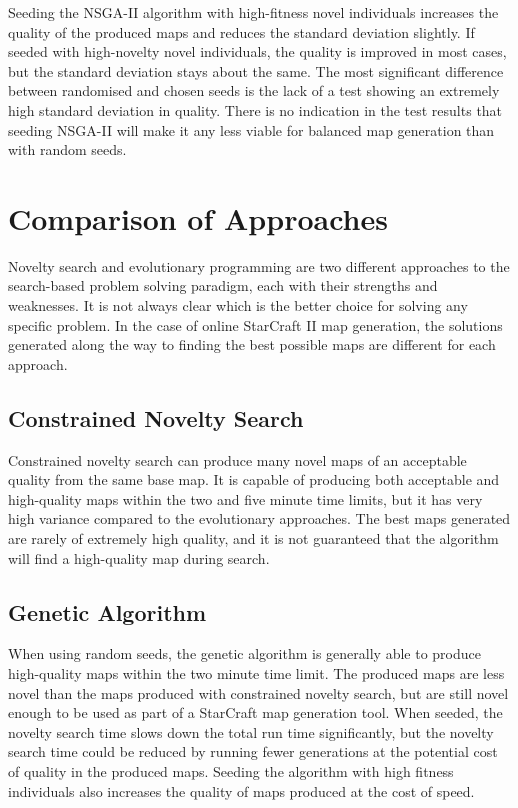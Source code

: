 Seeding the NSGA-II algorithm with high-fitness novel individuals increases the quality of the produced maps and reduces the standard deviation slightly. If seeded with high-novelty novel individuals, the quality is improved in most cases, but the standard deviation stays about the same. The most significant difference between randomised and chosen seeds is the lack of a test showing an extremely high standard deviation in quality. There is no indication in the test results that seeding NSGA-II will make it any less viable for balanced map generation than with random seeds. 

\section{Comparison of Approaches}
\label{discussion_comparison}
Novelty search and evolutionary programming are two different approaches to the search-based problem solving paradigm, each with their strengths and weaknesses. It is not always clear which is the better choice for solving any specific problem. In the case of online StarCraft II map generation, the solutions generated along the way to finding the best possible maps are different for each approach.

\subsection{Constrained Novelty Search}
\label{discussion_comparison_constrainednoveltysearch}
Constrained novelty search can produce many novel maps of an acceptable quality from the same base map. It is capable of producing both acceptable and high-quality maps within the two and five minute time limits, but it has very high variance compared to the evolutionary approaches. The best maps generated are rarely of extremely high quality, and it is not guaranteed that the algorithm will find a high-quality map during search.

\subsection{Genetic Algorithm}
\label{discussion_comparison_geneticalgorithm}
When using random seeds, the genetic algorithm is generally able to produce high-quality maps within the two minute time limit. The produced maps are less novel than the maps produced with constrained novelty search, but are still novel enough to be used as part of a StarCraft map generation tool. When seeded, the novelty search time slows down the total run time significantly, but the novelty search time could be reduced by running fewer generations at the potential cost of quality in the produced maps. Seeding the algorithm with high fitness individuals also increases the quality of maps produced at the cost of speed.

